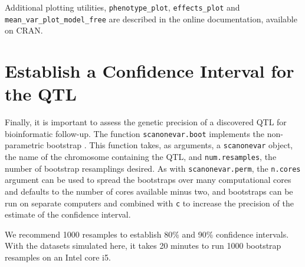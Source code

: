 \documentclass[9pt,twocolumn,twoside]{gsag3jnl}
\begin{document}
Additional plotting utilities, \texttt{phenotype\_plot}, \texttt{effects\_plot} and \texttt{mean\_var\_plot\_model\_free} are described in the online documentation, available on CRAN.

\section{Establish a Confidence Interval for the QTL}

Finally, it is important to assess the genetic precision of a discovered QTL for bioinformatic follow-up.
The function \texttt{scanonevar.boot} implements the non-parametric bootstrap \cite{Visscher1996}.
This function takes, as arguments, a \texttt{scanonevar} object, the name of the chromosome containing the QTL, and \texttt{num.resamples}, the number of bootstrap resamplings desired.
As with \texttt{scanonevar.perm}, the \texttt{n.cores} argument can be used to spread the bootstraps over many computational cores and defaults to the number of cores available minus two, and bootstraps can be run on separate computers and combined with \texttt{c} to increase the precision of the estimate of the confidence interval.

We recommend 1000 resamples to establish 80\% and 90\% confidence intervals.
With the datasets simulated here, it takes 20 minutes to run 1000 bootstrap resamples on an Intel core i5.
\end{document}

